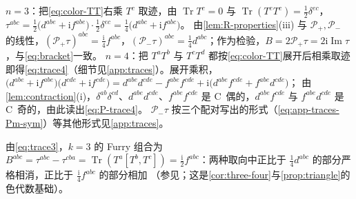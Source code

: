 \documentclass[UTF8,a4paper,11pt,fontset=fandol]{ctexart}
\makeatletter
\theoremstyle{cplain}
\theoremstyle{cdefinition}
\theoremstyle{cremark}
\renewcommand{\proofname}{证明}
\renewenvironment{proof}[1][\proofname]{\par\pushQED{\qed}\normalfont\topsep6\p@\@plus6\p@\relax
  \trivlist\item[\hskip\labelsep\itshape #1\hspace{0.5em}]\ignorespaces}{\popQED\endtrivlist\@endpefalse}
\numberwithin{equation}{section}
\DeclareMathOperator{\Tr}{Tr}
\DeclareMathOperator{\Imag}{Im}
\newcommand{\Pp}{\mathcal{P}_{+}}                    %
\newcommand{\Pm}{\mathcal{P}_{-}}                    %
\newcommand{\ii}{\mathrm{i}}                        %
\makeatother
\begin{document}
\begin{proof}
$n=3$：把\cref{eq:color-TT}右乘 $T^c$ 取迹，由 $\Tr T^c=0$ 与 $\Tr(T^eT^c)=\frac12\delta^{ec}$，
$\tau^{abc}=\frac12\bigl(d^{abe}+\ii f^{abe}\bigr)\cdot\frac12\delta^{ec}=\frac14\bigl(d^{abc}+\ii f^{abc}\bigr)$。
由\cref{lem:R-properties}(iii) 与 $\Pp,\Pm$ 的线性，$(\Pp\tau)^{abc}=\frac{\ii}{4}f^{abc}$，$(\Pm\tau)^{abc}=\frac14d^{abc}$；作为检验，$B=2\Pp\tau=2\ii\Imag\tau$，与\cref{eq:bracket}一致。
$n=4$：把 $T^aT^b$ 与 $T^cT^d$ 都按\cref{eq:color-TT}展开后相乘取迹即得\cref{eq:trace4}（细节见\cref{app:traces}）。展开乘积，
$\bigl(d^{abe}+\ii f^{abe}\bigr)\bigl(d^{cde}+\ii f^{cde}\bigr)=d^{abe}d^{cde}-f^{abe}f^{cde}+\ii\bigl(d^{abe}f^{cde}+f^{abe}d^{cde}\bigr)$；
由\cref{lem:contraction}(i)，$\delta^{ab}\delta^{cd}$、$d^{abe}d^{cde}$、$f^{abe}f^{cde}$ 是 C~偶的，$d^{abe}f^{cde}$ 与 $f^{abe}d^{cde}$ 是 C~奇的，由此读出\cref{eq:P-trace4}。
$\Pm\tau$ 按三个配对写出的形式（\cref{eq:app-traces-Pm-sym}）等其他形式见\cref{app:traces}。
\end{proof}

由\cref{eq:trace3}，$k=3$ 的 Furry 组合为 $B^{abc}=\tau^{abc}-\tau^{cba}=\Tr(T^a[T^b,T^c])=\frac{\ii}2f^{abc}$：两种取向中正比于 $\frac14d^{abc}$ 的部分严格相消，正比于 $\frac{\ii}4f^{abc}$ 的部分相加
（参见\cite{BlumAlkoferHuberWindisch2015}；这是\cref{cor:three-four}与\cref{prop:triangle}的色代数基础）。
\end{document}
